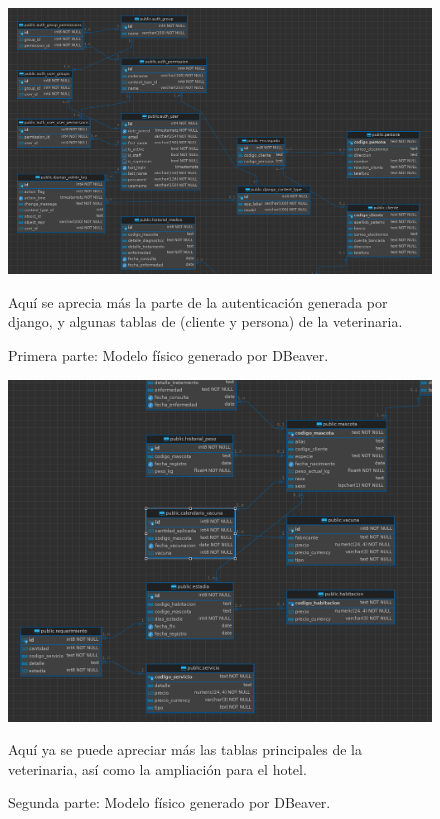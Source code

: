 \documentclass[
  12pt,
  hidelinks,
  a4paper,
  headings=standardclasses,
  headings=big,
  spanish
]{scrartcl}
\begin{document}
\begin{figure}[H]
  \centering
  \includegraphics[width=1\textwidth]{dbeaver-1.png}
  \caption{Primera parte: Modelo físico generado por DBeaver.}
  \medskip
  \small
  Aquí se aprecia más la parte de la autenticación generada por django, y algunas tablas de (cliente y persona) de la veterinaria.
\end{figure}

\begin{figure}[H]
  \centering
  \includegraphics[width=1\textwidth]{dbeaver-2.png}
  \caption{Segunda parte: Modelo físico generado por DBeaver.}
  \medskip
  \small
  Aquí ya se puede apreciar más las tablas principales de la veterinaria, así como la ampliación para el hotel.
\end{figure}
\end{document}
